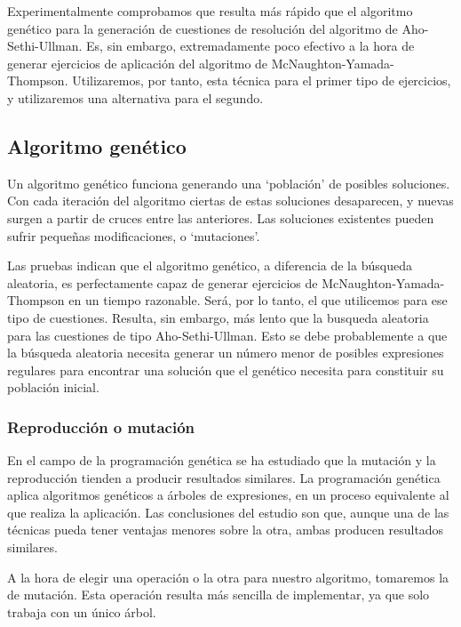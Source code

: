 Experimentalmente comprobamos que resulta más rápido que el algoritmo genético para la generación de cuestiones de resolución del algoritmo de Aho-Sethi-Ullman.
Es, sin embargo, extremadamente poco efectivo a la hora de generar ejercicios de aplicación del algoritmo de McNaughton-Yamada-Thompson.
Utilizaremos, por tanto, esta técnica para el primer tipo de ejercicios, y utilizaremos una alternativa para el segundo.

\subsection{Algoritmo genético}
Un algoritmo genético funciona generando una `población' de posibles soluciones.
Con cada iteración del algoritmo ciertas de estas soluciones desaparecen, y nuevas surgen a partir de cruces entre las anteriores.
Las soluciones existentes pueden sufrir pequeñas modificaciones, o `mutaciones'.

Las pruebas indican que el algoritmo genético, a diferencia de la búsqueda aleatoria, es perfectamente capaz de generar ejercicios de McNaughton-Yamada-Thompson en un tiempo razonable.
Será, por lo tanto, el que utilicemos para ese tipo de cuestiones.
Resulta, sin embargo, más lento que la busqueda aleatoria para las cuestiones de tipo Aho-Sethi-Ullman.
Esto se debe probablemente a que la búsqueda aleatoria necesita generar un número menor de posibles expresiones regulares para encontrar una solución que el genético necesita para constituir su población inicial.

\subsubsection{Reproducción o mutación}
En el campo de la programación genética se ha estudiado\cite{Luke98arevised} que la mutación y la reproducción tienden a producir resultados similares.
La programación genética aplica algoritmos genéticos a árboles de expresiones, en un proceso equivalente al que realiza la aplicación.
Las conclusiones del estudio son que, aunque una de las técnicas pueda tener ventajas menores sobre la otra, ambas producen resultados similares.

A la hora de elegir una operación o la otra para nuestro algoritmo, tomaremos la de mutación.
Esta operación resulta más sencilla de implementar, ya que solo trabaja con un único árbol.